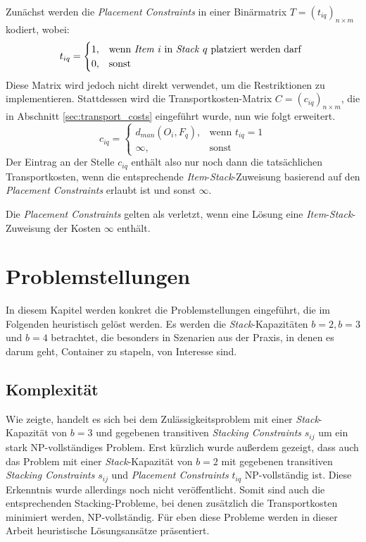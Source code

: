 Zunächst werden die \textit{Placement Constraints} in einer Binärmatrix $T = (t_{iq})_{n \times m}$ kodiert, wobei:\newline
\[
    t_{iq} =
\begin{cases}
    1, & \text{wenn \textit{Item} $i$ in \textit{Stack} $q$ platziert werden darf }\\
    0, & \text{sonst}
\end{cases}
\]
Diese Matrix wird jedoch nicht direkt verwendet, um die Restriktionen zu implementieren. Stattdessen wird
die Transportkosten-Matrix $C = (c_{iq})_{n \times m}$, die in Abschnitt \ref{sec:transport_costs} eingeführt wurde, nun wie folgt erweitert.
\[
    c_{iq} =
\begin{cases}
    d_{man}(O_i, F_q), & \text{wenn $t_{iq} = 1$}\\
    \infty, & \text{sonst}
\end{cases}
\]
Der Eintrag an der Stelle $c_{iq}$ enthält also nur noch dann die tatsächlichen Transportkosten, wenn die
entsprechende \textit{Item}-\textit{Stack}-Zuweisung basierend auf den \textit{Placement Constraints} erlaubt ist und sonst $\infty$.

Die \textit{Placement Constraints} gelten als verletzt, wenn eine Lösung eine \textit{Item}-\textit{Stack}-Zuweisung der Kosten $\infty$ enthält.

\pagebreak

\section{Problemstellungen}
\label{sec:problem_settings}

In diesem Kapitel werden konkret die Problemstellungen eingeführt, die im Folgenden heuristisch gelöst werden.
Es werden die \textit{Stack}-Kapazitäten $b=2, b=3 $ und $ b=4$ betrachtet, die besonders in Szenarien aus der Praxis, in denen
es darum geht, Container zu stapeln, von Interesse sind.

\subsection{Komplexität}
\label{sec:complexity}

Wie \cite{Bruns2015} zeigte, handelt es sich bei dem Zulässigkeitsproblem mit einer \textit{Stack}-Kapazität von $b=3$ und gegebenen transitiven \textit{Stacking Constraints} $s_{ij}$ um ein stark NP-vollständiges Problem. Erst kürzlich wurde außerdem gezeigt, dass auch das Problem mit einer \textit{Stack}-Kapazität von $b=2$ mit gegebenen transitiven \textit{Stacking Constraints} $s_{ij}$ und \textit{Placement Constraints} $t_{iq}$ NP-vollständig ist. Diese Erkenntnis wurde allerdings noch nicht veröffentlicht. Somit sind auch die entsprechenden Stacking-Probleme, bei denen zusätzlich die Transportkosten minimiert werden, NP-vollständig. Für eben diese Probleme werden in dieser Arbeit heuristische Lösungsansätze präsentiert.

